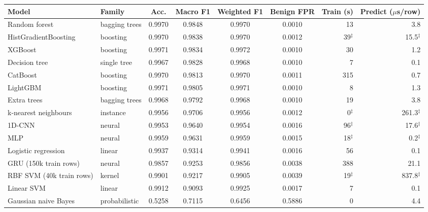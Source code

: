 \begin{adjustbox}{max width=\linewidth}
\begin{tabular}{llccccrr}
\toprule
Model & Family & Acc. & Macro F1 & Weighted F1 & Benign FPR & Train (s) & Predict ($\mu$s/row) \\
\midrule
Random forest & bagging trees & 0.9970 & 0.9848 & 0.9970 & 0.0010 & 13 & 3.8 \\
HistGradientBoosting & boosting & 0.9970 & 0.9838 & 0.9970 & 0.0012 & 39$^\ddagger$ & 15.5$^\ddagger$ \\
XGBoost & boosting & 0.9971 & 0.9834 & 0.9972 & 0.0010 & 30 & 1.2 \\
Decision tree & single tree & 0.9967 & 0.9828 & 0.9968 & 0.0010 & 7 & 0.1 \\
CatBoost & boosting & 0.9970 & 0.9813 & 0.9970 & 0.0011 & 315 & 0.7 \\
LightGBM & boosting & 0.9971 & 0.9805 & 0.9971 & 0.0010 & 8 & 1.3 \\
Extra trees & bagging trees & 0.9968 & 0.9792 & 0.9968 & 0.0010 & 19 & 3.8 \\
k-nearest neighbours & instance & 0.9956 & 0.9706 & 0.9956 & 0.0012 & 0$^\ddagger$ & 261.3$^\ddagger$ \\
1D-CNN & neural & 0.9953 & 0.9640 & 0.9954 & 0.0016 & 96$^\ddagger$ & 17.6$^\ddagger$ \\
MLP & neural & 0.9959 & 0.9631 & 0.9959 & 0.0015 & 18$^\ddagger$ & 0.2$^\ddagger$ \\
Logistic regression & linear & 0.9937 & 0.9314 & 0.9941 & 0.0016 & 56 & 0.1 \\
GRU (150k train rows) & neural & 0.9857 & 0.9253 & 0.9856 & 0.0038 & 388 & 21.1 \\
RBF SVM (40k train rows) & kernel & 0.9901 & 0.9217 & 0.9905 & 0.0039 & 19$^\ddagger$ & 837.8$^\ddagger$ \\
Linear SVM & linear & 0.9912 & 0.9093 & 0.9925 & 0.0017 & 7 & 0.1 \\
Gaussian naive Bayes & probabilistic & 0.5258 & 0.7115 & 0.6456 & 0.5886 & 0 & 4.4 \\
\bottomrule
\end{tabular}
\end{adjustbox}
